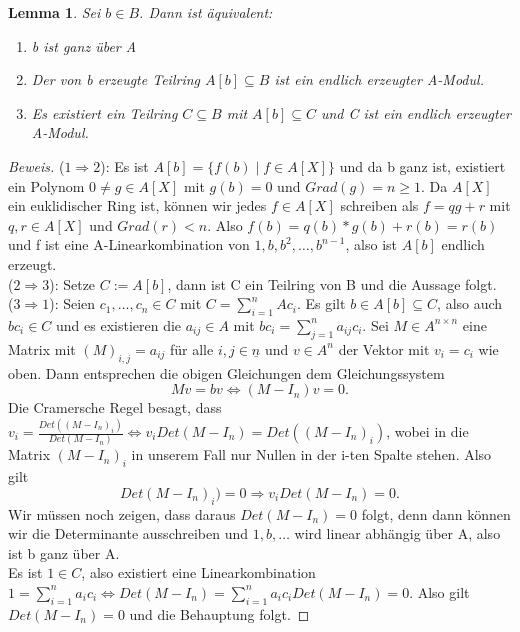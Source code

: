 \documentclass{article}
\newtheorem{lemma}[satz]{Lemma}
\begin{document}
	\begin{lemma} \label{2.1.1}
	Sei \(b \in B\). Dann ist äquivalent:
	\begin{enumerate}
	\item b ist ganz über A
	\item Der von b erzeugte Teilring \(A[b] \subseteq B\) ist ein endlich
	erzeugter A-Modul.
	\item Es existiert ein Teilring \(C \subseteq B\) mit \(A[b] \subseteq C\)
	und C ist ein endlich erzeugter A-Modul.
	\end{enumerate}
	\end{lemma}

	\begin{proof}[Beweis]
	(\(1 \Rightarrow 2\)): Es ist \(A[b] = \{f(b)\;|\;f\in A[X]\}\)
	und da b ganz ist, existiert ein Polynom \(0 \neq g \in A[X]\) mit \(g(b) 
	= 0\) und \(Grad(g) = n \geq 1\). Da \(A[X]\) ein euklidischer Ring ist, können
	wir jedes \(f \in A[X]\) schreiben als \(f = qg + r\) mit \(q,r \in A[X]\)
	und \(Grad(r) < n\). Also \(f(b) = q(b)*g(b) + r(b) = r(b)\) und f ist eine
	A-Linearkombination von \(1, b, b^2, \ldots, b^{n-1}\), also ist \(A[b]\)
	endlich erzeugt. \\
	(\(2 \Rightarrow 3\)): Setze \(C := A[b]\), dann ist C ein Teilring von B
	und die Aussage folgt. \\
	(\(3 \Rightarrow 1\)): Seien \(c_1, \ldots, c_n \in C\) mit \(C =
	\sum_{i=1}^n Ac_i\). Es gilt \(b \in A[b] \subseteq C\), also auch \(bc_i
	\in C\) und es existieren die \(a_{ij} \in A\) mit \(bc_i = \sum_{j=1}^n
	a_{ij}c_i\). Sei \(M \in A^{n\times n}\) eine Matrix mit \((M)_{i,j} =
	a_{ij}\) für alle \(i, j \in \underline{n}\) und \(v \in A^n\) der Vektor
	mit \(v_i = c_i\) wie oben. Dann entsprechen die obigen Gleichungen dem
	Gleichungssystem
	\begin{displaymath}Mv = bv \Leftrightarrow (M-I_n)v = 0.\end{displaymath}
	Die Cramersche Regel besagt, dass \(v_i = \frac{Det((M-I_n)_i)}{Det(M-I_n)}
	\Leftrightarrow v_iDet(M-I_n) = Det((M-I_n)_i)\), wobei in die Matrix
	\((M-I_n)_i \) in unserem Fall nur Nullen in der i-ten Spalte stehen. Also
	gilt \begin{displaymath} Det(M-I_n)_i) = 0 \Rightarrow v_iDet(M-I_n) = 0.
	\end{displaymath}
	Wir müssen noch zeigen, dass daraus \(Det(M-I_n) = 0\) folgt, denn dann 
	können wir die Determinante ausschreiben und \(1, b, \ldots\) wird linear
	abhängig über A, also ist b ganz über A. \\
	Es ist \(1 \in C\), also existiert eine Linearkombination \(1 =
	\sum_{i=1}^n a_ic_i \Leftrightarrow Det(M-I_n) = \sum_{i=1}^n
	a_ic_iDet(M-I_n) = 0\). Also gilt \(Det(M-I_n) = 0\) und die
	Behauptung folgt.
	\end{proof}
\end{document}
